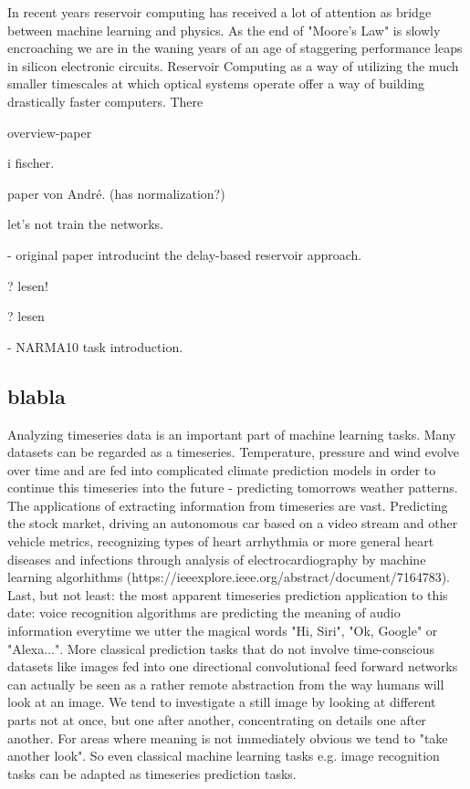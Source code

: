	In recent years reservoir computing has received a lot of attention as bridge between machine learning and physics. As the end of "Moore's Law" is slowly encroaching we are in the waning years of an age of staggering performance leaps in silicon electronic circuits. Reservoir Computing as a way of utilizing the much smaller timescales at which optical systems operate offer a way of building drastically faster computers. There
	
	\cite{SAN17a} overview-paper

	\cite{LAR12} i fischer.
	
	\cite{ROE18a} paper von André. (has normalization?)
	
	\cite{JAE01} let's not train the networks.
	
	\cite{APP11} - original paper introducint the delay-based reservoir approach.
	
	\cite{ANT19} ? lesen!
	
	\cite{STE20} ? lesen
	
	\cite{ATI00} - NARMA10 task introduction.
	



\subsection{blabla}

Analyzing timeseries data is an important part of machine learning tasks. Many datasets can be regarded as a timeseries. Temperature, pressure and wind evolve over time and are fed into complicated climate prediction models in order to continue this timeseries into the future - predicting tomorrows weather patterns. The applications of extracting information from timeseries are vast. Predicting the stock market, driving an autonomous car based on a video stream and other vehicle metrics, recognizing types of heart arrhythmia or more general heart diseases and infections through analysis of electrocardiography by machine learning algorhithms (https://ieeexplore.ieee.org/abstract/document/7164783). Last, but not least: the most apparent timeseries prediction application to this date: voice recognition algorithms are predicting the meaning of audio information everytime we utter the magical words "Hi, Siri", "Ok, Google" or "Alexa...". 
More classical prediction tasks that do not involve time-conscious datasets like images fed into one directional convolutional feed forward networks can actually be seen as a rather remote abstraction from the way humans will look at an image. We tend to investigate a still image by looking at different parts not at once, but one after another, concentrating on details one after another. For areas where meaning is not immediately obvious we tend to "take another look". So even classical machine learning tasks e.g. image recognition tasks can be adapted as timeseries prediction tasks.  


